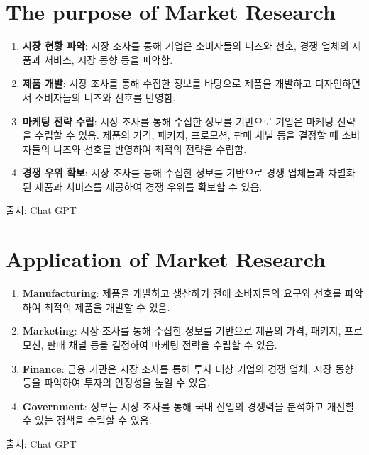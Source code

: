 \documentclass[
]{book}
\begin{document}
\hypertarget{the-purpose-of-market-research}{%
\section{The purpose of Market Research}\label{the-purpose-of-market-research}}

\begin{enumerate}
\def\labelenumi{\arabic{enumi}.}
\item
  \textbf{시장 현황 파악}: 시장 조사를 통해 기업은 소비자들의 니즈와 선호, 경쟁 업체의 제품과 서비스, 시장 동향 등을 파악함.
\item
  \textbf{제품 개발}: 시장 조사를 통해 수집한 정보를 바탕으로 제품을 개발하고 디자인하면서 소비자들의 니즈와 선호를 반영함.
\item
  \textbf{마케팅 전략 수립}: 시장 조사를 통해 수집한 정보를 기반으로 기업은 마케팅 전략을 수립할 수 있음. 제품의 가격, 패키지, 프로모션, 판매 채널 등을 결정할 때 소비자들의 니즈와 선호를 반영하여 최적의 전략을 수립함.
\item
  \textbf{경쟁 우위 확보}: 시장 조사를 통해 수집한 정보를 기반으로 경쟁 업체들과 차별화된 제품과 서비스를 제공하여 경쟁 우위를 확보할 수 있음.
\end{enumerate}

출처: Chat GPT

\hypertarget{application-of-market-research}{%
\section{Application of Market Research}\label{application-of-market-research}}

\begin{enumerate}
\def\labelenumi{\arabic{enumi}.}
\item
  \textbf{Manufacturing}: 제품을 개발하고 생산하기 전에 소비자들의 요구와 선호를 파악하여 최적의 제품을 개발할 수 있음.
\item
  \textbf{Marketing}: 시장 조사를 통해 수집한 정보를 기반으로 제품의 가격, 패키지, 프로모션, 판매 채널 등을 결정하여 마케팅 전략을 수립할 수 있음.
\item
  \textbf{Finance}: 금융 기관은 시장 조사를 통해 투자 대상 기업의 경쟁 업체, 시장 동향 등을 파악하여 투자의 안정성을 높일 수 있음.
\item
  \textbf{Government}: 정부는 시장 조사를 통해 국내 산업의 경쟁력을 분석하고 개선할 수 있는 정책을 수립할 수 있음.
\end{enumerate}

출처: Chat GPT
\end{document}
